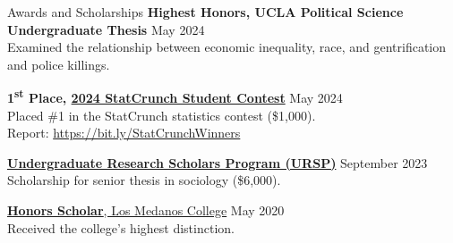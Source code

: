 \documentclass[
	11pt, %
]{resume} %
\begin{document}
\begin{samepage}
\begin{rSection}{Awards and Scholarships}
\textbf{Highest Honors, UCLA Political Science Undergraduate Thesis} \hfill May 2024 \\
Examined the relationship between economic inequality, race, and gentrification and police killings.

\textbf{1\textsuperscript{st} Place, \href{https://www.pearson.com/content/dam/global-store/en-us/resources/StatCrunch-Contest-Terms-Conditions-Contests-Pearson-Education-Inc.pdf}{2024 StatCrunch Student Contest}} \hfill May 2024\\
Placed \#1 in the StatCrunch statistics contest (\$\thinspace{}1,000).\\
Report: \href{https://bit.ly/StatCrunchWinners}{https://bit.ly/StatCrunchWinners}

\href{https://hass.ugresearch.ucla.edu/scholarships/ursp/students/}{\textbf{Undergraduate Research Scholars Program (URSP)}} \hfill September 2023 \\
Scholarship for senior thesis in sociology (\$\thinspace{}6,000).

\href{https://www.losmedanos.edu/honors/prog.aspx\#:~:text=Honors\%20Scholar\%20Requirements}{\textbf{Honors Scholar}, Los Medanos College} \hfill May 2020 \\
Received the college’s highest distinction.
\end{rSection}
\end{samepage}
\end{document}
